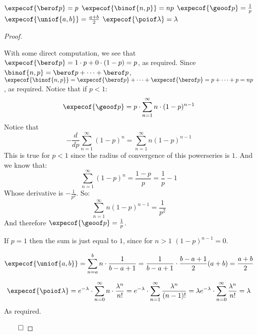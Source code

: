 \begin{prop*}

	\begin{msecenumerate}[0pt]
		\mitem $\expecof{\berof p}=p$
		\mitem $\expecof{\binof{n,p}}=np$
		\mitem $\expecof{\geoof p}=\frac1p$
		\mitem $\expecof{\uniof{a,b}}=\frac{a+b}2$
		\mitem $\expecof{\poiof\lambda}=\lambda$
	\end{msecenumerate}

\end{prop*}

\begin{proof}

	\begin{msecenumerate}[0pt]
		\mitem With some direct computation, we see that $\expecof{\berof p}=1\cdot p + 0\cdot(1-p)=p$, as required.
		\mitem Since $\binof{n,p}=\berof p +\cdots+ \berof p$, $\expecof{\binof{n,p}}=\expecof{\berof p}+\cdots+\expecof{\berof p}
		= p+\cdots+p = np$, as required.
		\mitem Notice that if $p<1$:
		\[ \expecof{\geoof p} = p\cdot\sum_{n=1}^\infty n\cdot(1-p)^{n-1} \]
		Notice that
		\[ -\frac{d}{dp}\sum_{n=1}^\infty (1-p)^n = \sum_{n=1}^\infty n(1-p)^{n-1} \]
		This is true for $p<1$ since the radius of convergence of this powerseries is $1$.
		And we know that:
		\[ \sum_{n=1}^\infty (1-p)^n = \frac{1-p}{p} = \frac1p - 1 \]
		Whose derivative is $-\frac1{p^2}$.
		So:
		\[ \sum_{n=1}^\infty n(1-p)^{n-1} = \frac1{p^2} \]
		And therefore $\expecof{\geoof p}=\frac1p$.

		If $p=1$ then the sum is just equal to $1$, since for $n>1$ $(1-p)^{n-1}=0$.

		\mitem 
		\[ \expecof{\uniof{a,b}} = \sum_{n=a}^b n\cdot\frac1{b-a+1} = \frac1{b-a+1}\cdot\frac{b-a+1}2(a+b) = \frac{a+b}2 \]

		\mitem \[ \expecof{\poiof\lambda} = e^{-\lambda}\cdot\sum_{n=0}^\infty n\cdot\frac{\lambda^n}{n!} 
		= e^{-\lambda}\cdot\sum_{n=1}^\infty\frac{\lambda^n}{(n-1)!} = \lambda e^{-\lambda}\cdot\sum_{n=0}^\infty\frac{\lambda^n}{n!}
		= \lambda \]
		As required.
	\end{msecenumerate}

	\hfill$\qed$

\end{proof}

